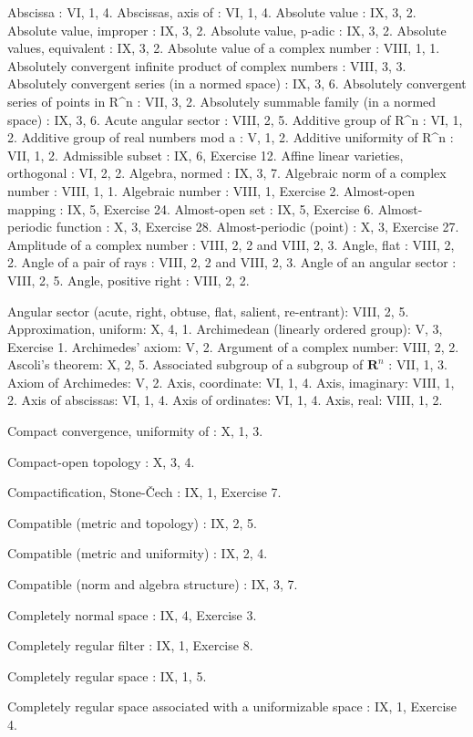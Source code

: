 Abscissa : VI, 1, 4. Abscissas, axis of : VI, 1, 4. Absolute value : IX, 3, 2. Absolute value, improper : IX, 3, 2. Absolute value, p-adic : IX, 3, 2. Absolute values, equivalent : IX, 3, 2. Absolute value of a complex number : VIII, 1, 1. Absolutely convergent infinite product of complex numbers : VIII, 3, 3. Absolutely convergent series (in a normed space) : IX, 3, 6. Absolutely convergent series of points in R\^{}n : VII, 3, 2. Absolutely summable family (in a normed space) : IX, 3, 6. Acute angular sector : VIII, 2, 5. Additive group of R\^{}n : VI, 1, 2. Additive group of real numbers mod a : V, 1, 2. Additive uniformity of R\^{}n : VII, 1, 2. Admissible subset : IX, 6, Exercise 12. Affine linear varieties, orthogonal : VI, 2, 2. Algebra, normed : IX, 3, 7. Algebraic norm of a complex number : VIII, 1, 1. Algebraic number : VIII, 1, Exercise 2. Almost-open mapping : IX, 5, Exercise 24. Almost-open set : IX, 5, Exercise 6. Almost-periodic function : X, 3, Exercise 28. Almost-periodic (point) : X, 3, Exercise 27. Amplitude of a complex number : VIII, 2, 2 and VIII, 2, 3. Angle, flat : VIII, 2, 2. Angle of a pair of rays : VIII, 2, 2 and VIII, 2, 3. Angle of an angular sector : VIII, 2, 5. Angle, positive right : VIII, 2, 2.

Angular sector (acute, right, obtuse, flat, salient, re-entrant): VIII, 2, 5. Approximation, uniform: X, 4, 1. Archimedean (linearly ordered group): V, 3, Exercise 1. Archimedes' axiom: V, 2. Argument of a complex number: VIII, 2, 2. Ascoli's theorem: X, 2, 5. Associated subgroup of a subgroup of \(\mathbf{R}^n\) : VII, 1, 3. Axiom of Archimedes: V, 2. Axis, coordinate: VI, 1, 4. Axis, imaginary: VIII, 1, 2. Axis of abscissas: VI, 1, 4. Axis of ordinates: VI, 1, 4. Axis, real: VIII, 1, 2.

Compact convergence, uniformity of : X, 1, 3.

Compact-open topology : X, 3, 4.

Compactification, Stone-Čech : IX, 1, Exercise 7.

Compatible (metric and topology) : IX, 2, 5.

Compatible (metric and uniformity) : IX, 2, 4.

Compatible (norm and algebra structure) : IX, 3, 7.

Completely normal space : IX, 4, Exercise 3.

Completely regular filter : IX, 1, Exercise 8.

Completely regular space : IX, 1, 5.

Completely regular space associated with a uniformizable space : IX, 1, Exercise 4.

